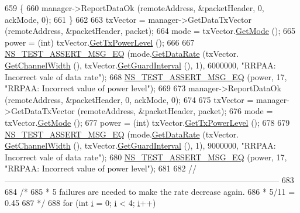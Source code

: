 \begin{DoxyCode}
659     \{
660       manager->ReportDataOk (remoteAddress, &packetHeader, 0, ackMode, 0);
661     \}
662 
663   txVector = manager->GetDataTxVector (remoteAddress, &packetHeader, packet);
664   mode = txVector.\hyperlink{classns3_1_1WifiTxVector_a497b1f11cad4b8b26251dfa07c9ad1d6}{GetMode} ();
665   power = (int) txVector.\hyperlink{classns3_1_1WifiTxVector_a7c98bd9609ff1c5cefa6e22d6908a2fe}{GetTxPowerLevel} ();
666 
667   \hyperlink{group__testing_ga2a9d78cffb3db8e867c35fff0b698cf5}{NS\_TEST\_ASSERT\_MSG\_EQ} (mode.\hyperlink{classns3_1_1WifiMode_adcfbe150f69da720db23387f733b8a52}{GetDataRate} (txVector.
      \hyperlink{classns3_1_1WifiTxVector_a1f8bfa51778a3e217581eb665f059564}{GetChannelWidth} (), txVector.\hyperlink{classns3_1_1WifiTxVector_ab80c0fd812542ef337a6cace4f64db63}{GetGuardInterval} (), 1), 6000000, \textcolor{stringliteral}{"RRPAA:
       Incorrect vale of data rate"});
668   \hyperlink{group__testing_ga2a9d78cffb3db8e867c35fff0b698cf5}{NS\_TEST\_ASSERT\_MSG\_EQ} (power, 17, \textcolor{stringliteral}{"RRPAA: Incorrect value of power level"});
669 
673   manager->ReportDataOk (remoteAddress, &packetHeader, 0, ackMode, 0);
674 
675   txVector = manager->GetDataTxVector (remoteAddress, &packetHeader, packet);
676   mode = txVector.\hyperlink{classns3_1_1WifiTxVector_a497b1f11cad4b8b26251dfa07c9ad1d6}{GetMode} ();
677   power = (int) txVector.\hyperlink{classns3_1_1WifiTxVector_a7c98bd9609ff1c5cefa6e22d6908a2fe}{GetTxPowerLevel} ();
678 
679   \hyperlink{group__testing_ga2a9d78cffb3db8e867c35fff0b698cf5}{NS\_TEST\_ASSERT\_MSG\_EQ} (mode.\hyperlink{classns3_1_1WifiMode_adcfbe150f69da720db23387f733b8a52}{GetDataRate} (txVector.
      \hyperlink{classns3_1_1WifiTxVector_a1f8bfa51778a3e217581eb665f059564}{GetChannelWidth} (), txVector.\hyperlink{classns3_1_1WifiTxVector_ab80c0fd812542ef337a6cace4f64db63}{GetGuardInterval} (), 1), 9000000, \textcolor{stringliteral}{"RRPAA:
       Incorrect vale of data rate"});
680   \hyperlink{group__testing_ga2a9d78cffb3db8e867c35fff0b698cf5}{NS\_TEST\_ASSERT\_MSG\_EQ} (power, 17, \textcolor{stringliteral}{"RRPAA: Incorrect value of power level"});
681 
682   \textcolor{comment}{//-----------------------------------------------------------------------------------------------------}
683 
684   \textcolor{comment}{/*}
685 \textcolor{comment}{   * 5 failures are needed to make the rate decrease again.}
686 \textcolor{comment}{   * 5/11 = 0.45}
687 \textcolor{comment}{   */}
688   \textcolor{keywordflow}{for} (\textcolor{keywordtype}{int} \hyperlink{bernuolliDistribution_8m_a6f6ccfcf58b31cb6412107d9d5281426}{i} = 0; \hyperlink{bernuolliDistribution_8m_a6f6ccfcf58b31cb6412107d9d5281426}{i} < 4; \hyperlink{bernuolliDistribution_8m_a6f6ccfcf58b31cb6412107d9d5281426}{i}++)

\end{DoxyCode}
